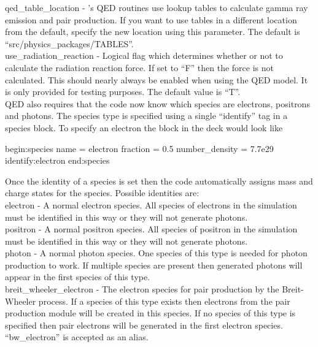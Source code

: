 {\emphtext qed\_table\_location} - {\EPOCH}'s QED routines use lookup tables to
  calculate gamma ray emission and pair production. If you want to use tables
  in a different location from the default, specify the new location using
  this parameter.  The default is ``src/physics\_packages/TABLES''.\\

{\emphtext use\_radiation\_reaction} - Logical flag which determines whether
  or not to calculate the radiation reaction force. If set to ``F'' then
  the force is not calculated. This should nearly always be enabled when
  using the QED model. It is only provided for testing purposes.
  The default value is ``T''.\\

QED also requires that the code now know which species are electrons,
positrons and photons. The species type is specified using a single
``identify'' tag in a species block. To specify an electron the block in the
deck would look like

\begin{boxverbatim}
begin:species
   name = electron
   fraction = 0.5
   number_density = 7.7e29
   identify:electron
end:species
\end{boxverbatim}

Once the identity of a species is set then the code automatically assigns
mass and charge states for the species.
Possible identities are:\\

{\emphtext electron} - A normal electron species. All species of electrons in
  the simulation must be identified in this way or they will not generate
  photons.\\

{\emphtext positron} - A normal positron species. All species of positron in
  the simulation must be identified in this way or they will not generate
  photons.\\

{\emphtext photon} - A normal photon species. One species of this type is
  needed for photon production to work. If multiple species are present then
  generated photons will appear in the first species of this type.\\

{\emphtext breit\_wheeler\_electron} - The electron species for pair production
  by the Breit-Wheeler process. If a species of this type exists then electrons
  from the pair production module will be created in this species. If no species
  of this type is specified then pair electrons will be generated in the first
  electron species. ``bw\_electron'' is accepted as an alias.\\

